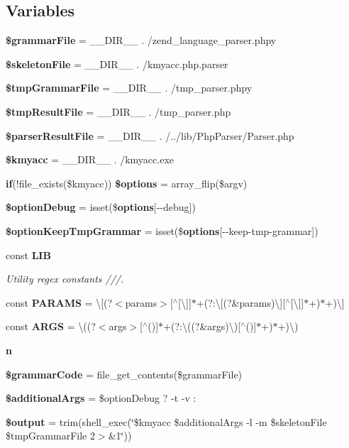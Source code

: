 \subsection*{Variables}
\begin{DoxyCompactItemize}
\item 
{\bf \$grammar\+File} = \+\_\+\+\_\+\+D\+I\+R\+\_\+\+\_\+ . \textquotesingle{}/zend\+\_\+language\+\_\+parser.\+phpy\textquotesingle{}
\item 
{\bf \$skeleton\+File} = \+\_\+\+\_\+\+D\+I\+R\+\_\+\+\_\+ . \textquotesingle{}/kmyacc.\+php.\+parser\textquotesingle{}
\item 
{\bf \$tmp\+Grammar\+File} = \+\_\+\+\_\+\+D\+I\+R\+\_\+\+\_\+ . \textquotesingle{}/tmp\+\_\+parser.\+phpy\textquotesingle{}
\item 
{\bf \$tmp\+Result\+File} = \+\_\+\+\_\+\+D\+I\+R\+\_\+\+\_\+ . \textquotesingle{}/tmp\+\_\+parser.\+php\textquotesingle{}
\item 
{\bf \$parser\+Result\+File} = \+\_\+\+\_\+\+D\+I\+R\+\_\+\+\_\+ . \textquotesingle{}/../lib/Php\+Parser/Parser.\+php\textquotesingle{}
\item 
{\bf \$kmyacc} = \+\_\+\+\_\+\+D\+I\+R\+\_\+\+\_\+ . \textquotesingle{}/kmyacc.\+exe\textquotesingle{}
\item 
{\bf if}(!file\+\_\+exists(\$kmyacc)) {\bf \$options} = array\+\_\+flip(\$argv)
\item 
{\bf \$option\+Debug} = isset(\${\bf options}[\textquotesingle{}-\/-\/debug\textquotesingle{}])
\item 
{\bf \$option\+Keep\+Tmp\+Grammar} = isset(\${\bf options}[\textquotesingle{}-\/-\/keep-\/tmp-\/grammar\textquotesingle{}])
\item 
const {\bf L\+I\+B}
\begin{DoxyCompactList}\small\item\em Utility regex constants ///. \end{DoxyCompactList}\item 
const {\bf P\+A\+R\+A\+M\+S} = \textquotesingle{}\textbackslash{}[(?$<$params$>$[$^\wedge$[\textbackslash{}]]$\ast$+(?\+:\textbackslash{}[(?\&params)\textbackslash{}][$^\wedge$[\textbackslash{}]]$\ast$+)$\ast$+)\textbackslash{}]\textquotesingle{}
\item 
const {\bf A\+R\+G\+S} = \textquotesingle{}\textbackslash{}((?$<$args$>$[$^\wedge$()]$\ast$+(?\+:\textbackslash{}((?\&args)\textbackslash{})[$^\wedge$()]$\ast$+)$\ast$+)\textbackslash{})\textquotesingle{}
\item 
{\bf n}
\item 
{\bf \$grammar\+Code} = file\+\_\+get\+\_\+contents(\$grammar\+File)
\item 
{\bf \$additional\+Args} = \$option\+Debug ? \textquotesingle{}-\/t -\/v\textquotesingle{} \+: \textquotesingle{}\textquotesingle{}
\item 
{\bf \$output} = trim(shell\+\_\+exec(\char`\"{}\$kmyacc \$additional\+Args -\/l -\/m \$skeleton\+File \$tmp\+Grammar\+File 2$>$\&1\char`\"{}))
\end{DoxyCompactItemize}


